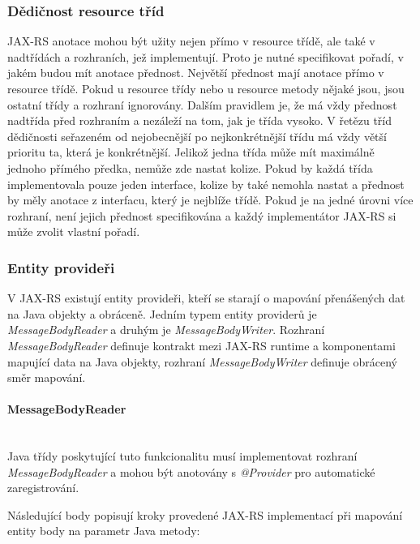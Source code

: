 \documentclass[11pt,twoside,a4paper]{book}
\begin{document}
\subsubsection{Dědičnost resource tříd}
\label{subsec:dedicnost-resource-trid}

JAX-RS anotace mohou být užity nejen přímo v resource třídě, ale také v
nadtřídách a rozhraních, jež implementují. Proto je nutné specifikovat pořadí,
v jakém budou mít anotace přednost. Největší přednost mají anotace přímo v
resource třídě. Pokud u resource třídy nebo u resource metody nějaké jsou, jsou
ostatní třídy a rozhraní ignorovány. Dalším pravidlem je, že má vždy přednost
nadtřída před rozhraním a nezáleží na tom, jak je třída vysoko. V řetězu tříd
dědičnosti seřazeném od nejobecnější po nejkonkrétnější třídu má vždy
větší prioritu ta, která je konkrétnější. Jelikož jedna třída může mít maximálně
jednoho přímého předka, nemůže zde nastat kolize. Pokud by každá třída
implementovala pouze jeden interface, kolize by také nemohla nastat a přednost
by měly anotace z interfacu, který je nejblíže třídě. Pokud je na jedné úrovni
více rozhraní, není jejich přednost specifikována a každý
implementátor JAX-RS si může zvolit vlastní pořadí.

\subsubsection{Entity provideři}
\label{subsec:entity-provideri}

V JAX-RS existují entity provideři, kteří se starají o mapování přenášených
dat na Java objekty a obráceně. Jedním typem entity providerů je {\em
MessageBodyReader} a druhým je {\em MessageBodyWriter}.  Rozhraní 
{\em MessageBodyReader} definuje kontrakt mezi JAX-RS runtime a komponentami
mapující data na Java objekty, rozhraní {\em MessageBodyWriter} definuje
obrácený směr mapování.

\paragraph{MessageBodyReader}
\label{par:messagebodyreader}
\mbox{}\\

Java třídy poskytující tuto funkcionalitu musí implementovat rozhraní
{\em MessageBodyReader} a mohou být anotovány s {\em @Provider} pro automatické
zaregistrování.

Následující body popisují kroky provedené JAX-RS implementací při mapování
entity body na parametr Java metody:
\end{document}
